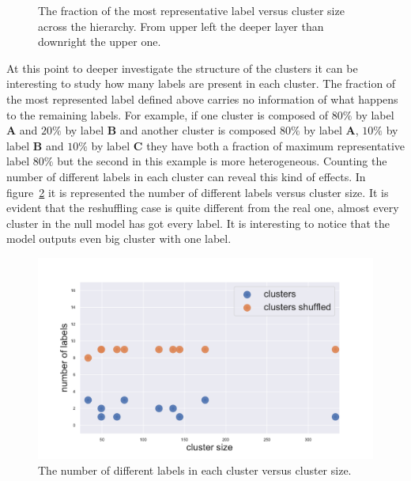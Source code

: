 \begin{figure}[htb!]
\begin{minipage}{0.45\textwidth}
	\end{minipage}
	\caption{The fraction of the most representative label versus cluster size across the hierarchy. From upper left the deeper layer than downright the upper one.}
	\label{fig:topic/gtex/oversigma_10tissue/shuffledclusterhomosize_l*}
\end{figure}

At this point to deeper investigate the structure of the clusters it can be interesting to study how many labels are present in each cluster. The fraction of the most represented label defined above carries no information of what happens to the remaining labels. For example, if one cluster is composed of $80\%$ by label \textbf{A} and $20\%$ by label \textbf{B} and another cluster is composed $80\%$ by label \textbf{A}, $10\%$ by label \textbf{B} and $10\%$ by label \textbf{C} they have both a fraction of maximum representative label $80\%$ but the second in this example is more heterogeneous. Counting the number of different labels in each cluster can reveal this kind of effects. In figure~\ref{fig:topic/gtex/oversigma_10tissue/shuffledcluster_shuffle_label_size_l3_primary_site} it is represented the number of different labels versus cluster size. It is evident that the reshuffling case is quite different from the real one, almost every cluster in the null model has got every label. It is interesting to notice that the model outputs even big cluster with one label.
\begin{figure}[htb!]
    \centering
    \includegraphics[width=0.9\linewidth]{pictures/topic/gtex/oversigma_10tissue/shuffledcluster_shuffle_label_size_l3_primary_site.pdf}
    \caption{The number of different labels in each cluster versus cluster size.}
    \label{fig:topic/gtex/oversigma_10tissue/shuffledcluster_shuffle_label_size_l3_primary_site}
\end{figure}
